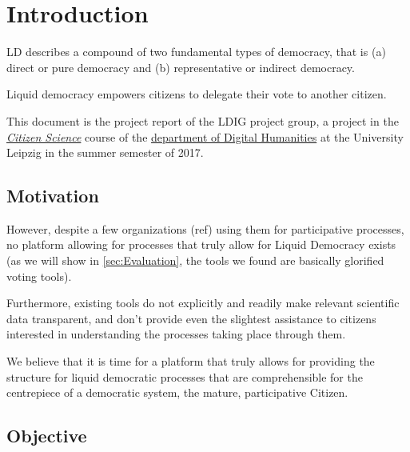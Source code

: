 \chapter{Introduction}
\label{ch:Introduction}

\acrfull{LD} describes a compound of two fundamental types of democracy, that is (a) direct or pure democracy and (b) representative or indirect democracy. 

Liquid democracy empowers citizens to delegate their vote to another citizen. 



This document is the project report of the LDIG project group, a project in the \href{http://www.dh.uni-leipzig.de/wo/courses/summer-semester-20142015/citizen-science/}{\textit{Citizen Science}} course of the \href{http://www.dh.uni-leipzig.de/wo/}{department of Digital Humanities} at the University Leipzig in the summer semester of 2017.

\section{Motivation}
\label{sec:Motivation}



However, despite a few organizations (ref) using them for participative processes, no platform allowing for processes that truly allow for Liquid Democracy exists (as we will show in \ref{sec:Evaluation}, the tools we found are basically glorified voting tools). 

Furthermore, existing tools do not explicitly and readily make relevant scientific data transparent, and don't provide even the slightest assistance to citizens interested in understanding the processes taking place through them. 

We believe that it is time for a platform that truly allows for providing the structure for liquid democratic processes that are comprehensible for the centrepiece of a democratic system, the mature, participative Citizen.


\section{Objective}
\label{sec:Objective}

